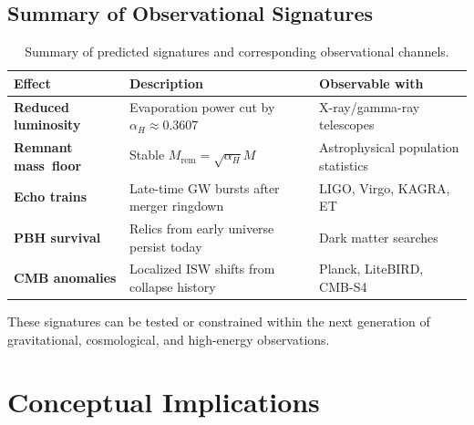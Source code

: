 \documentclass[a4paper, 12pt, oneside]{book}
\numberwithin{equation}{chapter}
\begin{document}
\section{Summary of Observational Signatures}
\label{sec:SummaryTable}
\begin{table}[ht]
\centering
\renewcommand{\arraystretch}{1.3}
\begin{tabular}{p{3.6cm}p{7.2cm}p{3cm}}
\toprule
\textbf{Effect} & \textbf{Description} & \textbf{Observable with} \\
\midrule
\textbf{Reduced \mbox{luminosity}} & Evaporation power cut by \( \alpha_H \approx 0.3607 \) & X-ray/gamma-ray telescopes \\
\textbf{Remnant \mbox{mass floor}} & Stable \( M_{\text{rem}} = \sqrt{\alpha_H} M \) & Astrophysical population statistics \\
\textbf{Echo trains} & Late-time GW bursts after merger ringdown & LIGO, Virgo, KAGRA, ET \\
\textbf{PBH survival} & Relics from early universe persist today & Dark matter searches \\
\textbf{CMB anomalies} & Localized ISW shifts from collapse history & Planck, LiteBIRD, CMB-S4 \\
\bottomrule
\end{tabular}
\caption[Summary of predicted signatures]{Summary of predicted signatures and corresponding observational channels.}
\label{tab:observables}
\end{table}

\noindent
These signatures can be tested or constrained within the next generation
of gravitational, cosmological, and high-energy observations.



\chapter[Conceptual Implications]{Conceptual Implications}
\label{chap:Conceptual}
\end{document}
